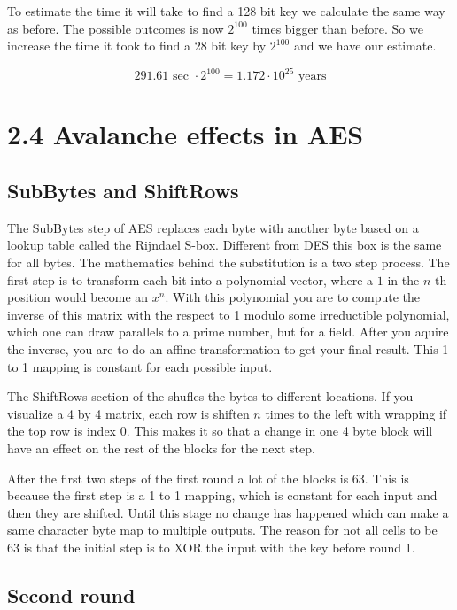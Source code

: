 To estimate the time it will take to find a 128 bit key we calculate the same way as before.
The possible outcomes is now $2^{100}$ times bigger than before.
So we increase the time it took to find a 28 bit key by $2^{100}$ and we have our estimate.

$$ 291.61 \text{ sec } \cdot 2^{100} = 1.172 \cdot 10^{25} \text{ years} $$

\section*{2.4 Avalanche effects in AES}

\subsection*{SubBytes and ShiftRows}

The SubBytes step of AES replaces each byte with another byte based on a lookup table called the Rijndael S-box.
Different from DES this box is the same for all bytes.
The mathematics behind the substitution is a two step process.
The first step is to transform each bit into a polynomial vector, where a $1$ in the $n\text{-th}$ position would become an $x^{n}$.
With this polynomial you are to compute the inverse of this matrix with the respect to 1 modulo some irreductible polynomial, which one can draw parallels to a prime number, but for a field.
After you aquire the inverse, you are to do an affine transformation to get your final result.
This 1 to 1 mapping is constant for each possible input.

The ShiftRows section of the shufles the bytes to different locations.
If you visualize a 4 by 4 matrix, each row is shiften $n$ times to the left with wrapping if the top row is index 0.
This makes it so that a change in one 4 byte block will have an effect on the rest of the blocks for the next step.

After the first two steps of the first round a lot of the blocks is 63.
This is because the first step is a 1 to 1 mapping, which is constant for each input and then they are shifted.
Until this stage no change has happened which can make a same character byte map to multiple outputs.
The reason for not all cells to be 63 is that the initial step is to XOR the input with the key before round 1.

\subsection*{Second round}

